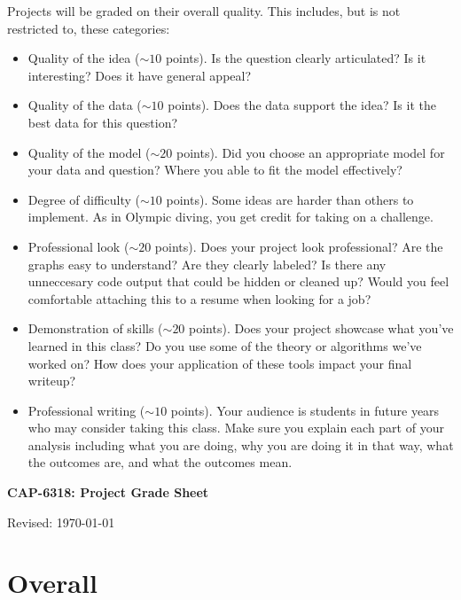 \documentclass[11pt]{article}
\begin{document}
Projects will be graded on their overall quality.  This includes, but is not
restricted to, these categories:
%
\begin{itemize}
      \item Quality of the idea ($\sim 10$ points).  Is the question clearly
            articulated?  Is it interesting? Does it have general appeal?
      \item Quality of the data ($\sim 10$ points).  Does the data support the
            idea? Is it the best data for this question?
      \item Quality of the model ($\sim 20$ points).  Did you choose an
            appropriate model for your data and question? Where you able to fit
            the model effectively?
      \item Degree of difficulty ($\sim 10$ points).  Some ideas are harder than
            others to implement. As in Olympic diving, you get credit for taking
            on a challenge.
      \item Professional look ($\sim 20$ points).  Does your project look
            professional?  Are the graphs easy to understand?  Are they clearly
            labeled? Is there any unneccesary code output that could be hidden
            or cleaned up? Would you feel comfortable attaching this to a resume
            when looking for a job?
      \item Demonstration of skills ($\sim 20$ points). Does your project
            showcase what you've learned in this class? Do you use some of the
            theory or algorithms we've worked on? How does your application of
            these tools impact your final writeup?
      \item Professional writing ($\sim 10$ points). Your audience is students
            in future years who may consider taking this class. Make sure you
            explain each part of your analysis including what you are doing, why
            you are doing it in that way, what the outcomes are, and what the
            outcomes mean.
\end{itemize}





\pagebreak
\thispagestyle{empty}


\bigskip\bigskip
\centerline{\Large \bf CAP-6318:  Project Grade Sheet}
\centerline{Revised: \today}


\section*{Overall}
\end{document}
